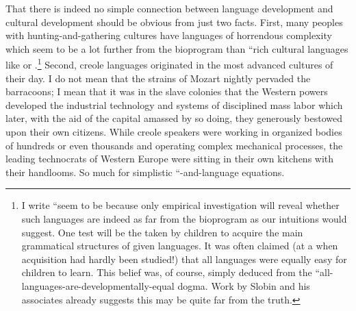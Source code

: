 That there is indeed no simple connection between language development and cultural development should be obvious from just two facts. First, many peoples with hunting-and-gathering cultures have languages of horrendous complexity which seem to be a lot further from the bioprogram than ``rich cultural languages like  or .\footnote{I write ``seem to be because only empirical investigation will reveal whether such languages are indeed as far from the bioprogram as our intuitions would suggest. One test will be the  taken by children to acquire the main grammatical structures of given languages. It was often claimed (at a  when acquisition had hardly been studied!) that all languages were equally easy for children to learn. This belief was, of course, simply deduced from the ``all-languages-are-developmentally-equal dogma. Work by Slobin and his associates already suggests this may be quite far from the truth.} Second, creole languages originated in the most advanced cultures of their day. I do not mean that the strains of Mozart nightly pervaded the barracoons; I mean that it was in the slave colonies that the Western powers developed the industrial technology and systems of disciplined mass labor which later, with the aid of the capital amassed by so doing, they generously bestowed upon their own citizens. While creole speakers were working in organized bodies of hundreds or even thousands and operating complex mechanical processes, the leading technocrats of Western Europe were sitting in their own kitchens with their handlooms. So much for simplistic ``-and-language equations.


